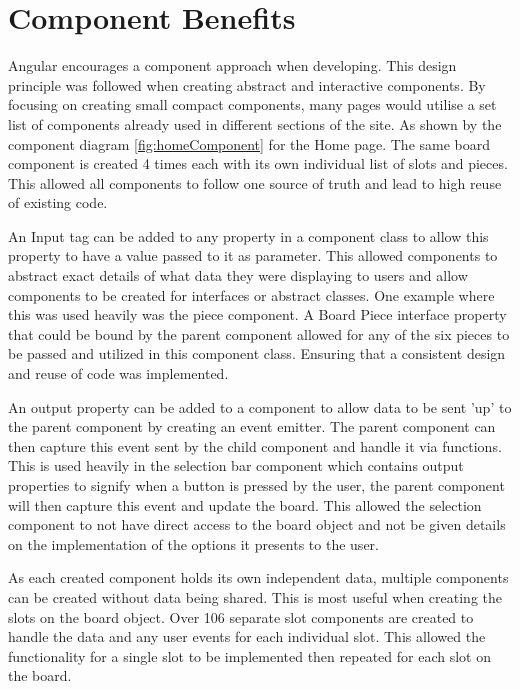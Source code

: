 \documentclass{l4proj}
\begin{document}

\section{Component Benefits}
Angular encourages a component approach when developing. This design principle was followed when creating abstract and interactive components. By focusing on creating small compact components, many pages would utilise a set list of components already used in different sections of the site. As shown by the component diagram \ref{fig:homeComponent} for the Home page. The same board component is created 4 times each with its own individual list of slots and pieces. This allowed all components to follow one source of truth and lead to high reuse of existing code. 

An Input tag can be added to any property in a component class to allow this property to have a value passed to it as parameter. This allowed components to abstract exact details of what data they were displaying to users and allow components to be created for interfaces or abstract classes. One example where this was used heavily was the piece component. A Board Piece interface property that could be bound by the parent component allowed for any of the six pieces to be passed and utilized in this component class. Ensuring that a consistent design and reuse of code was implemented. 

An output property can be added to a component to allow data to be sent 'up' to the parent component by creating an event emitter. The parent component can then capture this event sent by the child component and handle it via functions. This is used heavily in the selection bar component which contains output properties to signify when a button is pressed by the user, the parent component will then capture this event and update the board. This allowed the selection component to not have direct access to the board object and not be given details on the implementation of the options it presents to the user. 

As each created component holds its own independent data, multiple components can be created without data being shared. This is most useful when creating the slots on the board object. Over 106 separate slot components are created to handle the data and any user events for each individual slot. This allowed the functionality for a single slot to be implemented then repeated for each slot on the board.
\end{document}

